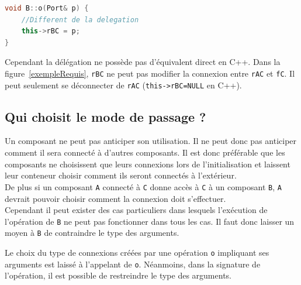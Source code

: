 \documentclass[11pt,a4paper,openany,oneside]{book}
\begin{document}
\newpage

\begin{lstlisting}[language=C++, caption=Equivalent en C++ d'un passage de port requis en paramètre de o]
void B::o(Port& p) {
    //Different de la delegation
    this->rBC = p;  
}
\end{lstlisting}
Cependant la délégation ne possède pas d'équivalent direct en C++. Dans la figure~\ref{exempleRequis}, \texttt{rBC} ne peut pas modifier la connexion entre \texttt{rAC} et \texttt{fC}. Il peut seulement se déconnecter de \texttt{rAC} (\texttt{this->rBC=NULL} en C++).

\subsection{Qui choisit le mode de passage ?}

Un composant ne peut pas anticiper son utilisation. Il ne peut donc pas anticiper comment il sera connecté à d'autres composants. Il est donc préférable que les composants ne choisissent que leurs connexions lors de l'initialisation et laissent leur conteneur choisir comment ils seront connectés à l'extérieur.\\
De plus si un composant \texttt{A} connecté à \texttt{C} donne accès à \texttt{C} à un composant \texttt{B}, \texttt{A} devrait pouvoir choisir comment la connexion doit s'effectuer.\\
Cependant il peut exister des cas particuliers dans lesquels l'exécution de l'opération de \texttt{B} ne peut pas fonctionner dans tous les cas. Il faut donc laisser un moyen à \texttt{B} de contraindre le type des arguments.

Le choix du type de connexions créées par une opération \texttt{o} impliquant ses arguments est laissé à l'appelant de \texttt{o}. Néanmoins, dans la signature de l'opération, il est possible de restreindre le type des arguments.
\end{document}
